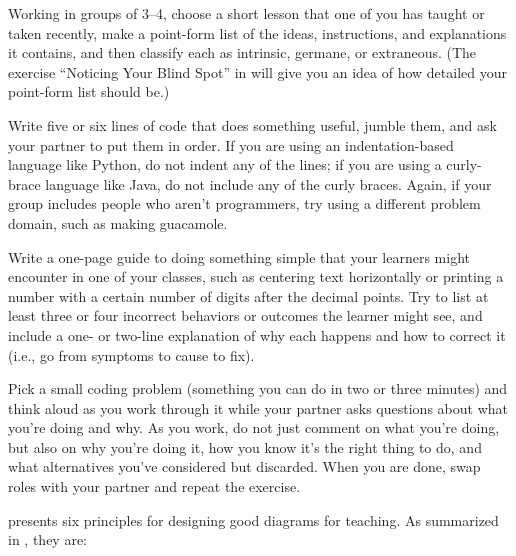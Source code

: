 
Working in groups of 3--4, choose a short lesson that one of you has
taught or taken recently, make a point-form list of the ideas,
instructions, and explanations it contains, and then classify each as
intrinsic, germane, or extraneous. (The exercise ``Noticing Your Blind
Spot'' in  will give you an idea of how
detailed your point-form list should be.)


Write five or six lines of code that does something useful, jumble them,
and ask your partner to put them in order. If you are using an
indentation-based language like Python, do not indent any of the lines;
if you are using a curly-brace language like Java, do not include any of
the curly braces. Again, if your group includes people who aren't
programmers, try using a different problem domain, such as making
guacamole.


Write a one-page guide to doing something simple that your learners
might encounter in one of your classes, such as centering text
horizontally or printing a number with a certain number of digits after
the decimal points. Try to list at least three or four incorrect
behaviors or outcomes the learner might see, and include a one- or
two-line explanation of why each happens and how to correct it (i.e., go
from symptoms to cause to fix).


Pick a small coding problem (something you can do in two or three
minutes) and think aloud as you work through it while your partner asks
questions about what you're doing and why. As you work, do not just
comment on what you're doing, but also on why you're doing it, how you
know it's the right thing to do, and what alternatives you've considered
but discarded. When you are done, swap roles with your partner and
repeat the exercise.


\cite{Maye2009} presents six principles for designing good diagrams
for teaching. As summarized in \cite{Mill2016a}, they are:

